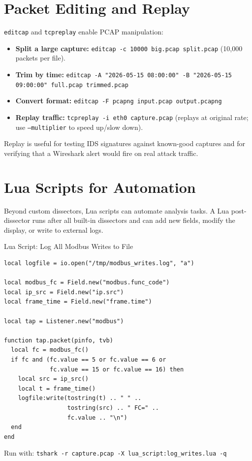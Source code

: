 \documentclass[12pt,twoside,openright]{memoir}
\begin{document}
\section{Packet Editing and Replay}

\texttt{editcap} and \texttt{tcpreplay} enable PCAP manipulation:

\begin{itemize}[noitemsep]
  \item \textbf{Split a large capture:} \texttt{editcap -c 10000 big.pcap split.pcap} (10,000 packets per file).
  \item \textbf{Trim by time:} \texttt{editcap -A "2026-05-15 08:00:00" -B "2026-05-15 09:00:00" full.pcap trimmed.pcap}
  \item \textbf{Convert format:} \texttt{editcap -F pcapng input.pcap output.pcapng}
  \item \textbf{Replay traffic:} \texttt{tcpreplay -i eth0 capture.pcap} (replays at original rate; use \texttt{--multiplier} to speed up/slow down).
\end{itemize}

Replay is useful for testing IDS signatures against known-good captures and for verifying that a Wireshark alert would fire on real attack traffic.

\section{Lua Scripts for Automation}

Beyond custom dissectors, Lua scripts can automate analysis tasks. A Lua post-dissector runs after all built-in dissectors and can add new fields, modify the display, or write to external logs.

\begin{example}{Lua Script: Log All Modbus Writes to File}
\begin{lstlisting}
local logfile = io.open("/tmp/modbus_writes.log", "a")

local modbus_fc = Field.new("modbus.func_code")
local ip_src = Field.new("ip.src")
local frame_time = Field.new("frame.time")

local tap = Listener.new("modbus")

function tap.packet(pinfo, tvb)
  local fc = modbus_fc()
  if fc and (fc.value == 5 or fc.value == 6 or
             fc.value == 15 or fc.value == 16) then
    local src = ip_src()
    local t = frame_time()
    logfile:write(tostring(t) .. " " ..
                  tostring(src) .. " FC=" ..
                  fc.value .. "\n")
  end
end
\end{lstlisting}
Run with: \texttt{tshark -r capture.pcap -X lua\_script:log\_writes.lua -q}
\end{example}
\end{document}
